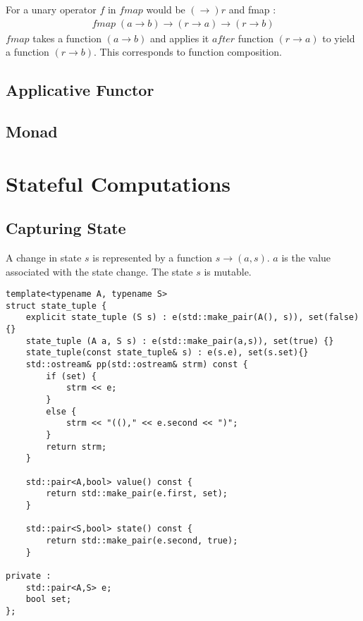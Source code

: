 \documentclass[12pt,fleqn]{article}
\begin{document}
For a unary operator $f$ in $fmap$  would be $(\rightarrow) r$ and fmap :
\begin{eqnarray*}
fmap \; (a \rightarrow b) \rightarrow (r \rightarrow a) \rightarrow (r \rightarrow b)
\end{eqnarray*}
$fmap$ takes a function $(a\rightarrow b)$ and applies it $after$ function $(r \rightarrow a)$ to yield a function $(r \rightarrow b)$.
This corresponds to function composition.

%
%
\subsection{Applicative Functor}
%
%


\subsection{Monad}




\section{Stateful Computations}

\subsection{Capturing State}
%
%

A change in state $s$ is represented by a function $s \rightarrow (a,s)$. 
$a$ is the value associated with the state change.
The state $s$ is mutable.

%
%
%
\begin{minipage}{\linewidth}
\begin{lstlisting}[caption=state tuple, label=state_tuple]
template<typename A, typename S>
struct state_tuple {
	explicit state_tuple (S s) : e(std::make_pair(A(), s)), set(false){}
	state_tuple (A a, S s) : e(std::make_pair(a,s)), set(true) {}
	state_tuple(const state_tuple& s) : e(s.e), set(s.set){}
	std::ostream& pp(std::ostream& strm) const {
		if (set) {
			strm << e;
		}
		else {
			strm << "(()," << e.second << ")";
		}
		return strm;
	}

	std::pair<A,bool> value() const {
		return std::make_pair(e.first, set);
	}

	std::pair<S,bool> state() const {
		return std::make_pair(e.second, true);
	}

private :	
	std::pair<A,S> e;
	bool set;
};
\end{lstlisting}
\end{minipage}
%
%
%
\end{document}
